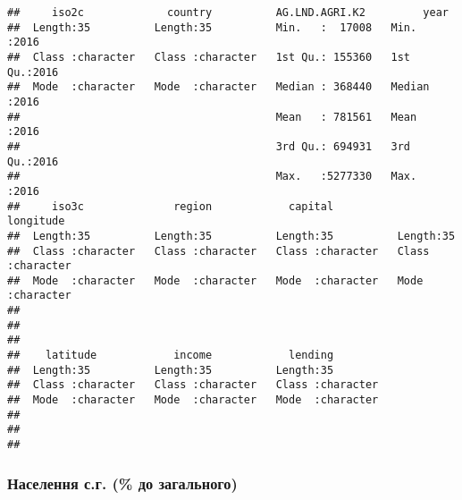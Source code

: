 \documentclass[
]{article}
\newenvironment{Shaded}{\begin{snugshade}}{\end{snugshade}}
\newcommand{\DataTypeTok}[1]{\textcolor[rgb]{0.13,0.29,0.53}{#1}}
\newcommand{\KeywordTok}[1]{\textcolor[rgb]{0.13,0.29,0.53}{\textbf{#1}}}
\newcommand{\NormalTok}[1]{#1}
\newcommand{\OperatorTok}[1]{\textcolor[rgb]{0.81,0.36,0.00}{\textbf{#1}}}
\newcommand{\OtherTok}[1]{\textcolor[rgb]{0.56,0.35,0.01}{#1}}
\newcommand{\StringTok}[1]{\textcolor[rgb]{0.31,0.60,0.02}{#1}}
\begin{document}
\begin{verbatim}
##     iso2c             country          AG.LND.AGRI.K2         year     
##  Length:35          Length:35          Min.   :  17008   Min.   :2016  
##  Class :character   Class :character   1st Qu.: 155360   1st Qu.:2016  
##  Mode  :character   Mode  :character   Median : 368440   Median :2016  
##                                        Mean   : 781561   Mean   :2016  
##                                        3rd Qu.: 694931   3rd Qu.:2016  
##                                        Max.   :5277330   Max.   :2016  
##     iso3c              region            capital           longitude        
##  Length:35          Length:35          Length:35          Length:35         
##  Class :character   Class :character   Class :character   Class :character  
##  Mode  :character   Mode  :character   Mode  :character   Mode  :character  
##                                                                             
##                                                                             
##                                                                             
##    latitude            income            lending         
##  Length:35          Length:35          Length:35         
##  Class :character   Class :character   Class :character  
##  Mode  :character   Mode  :character   Mode  :character  
##                                                          
##                                                          
## 
\end{verbatim}

\hypertarget{ux43dux430ux441ux435ux43bux435ux43dux43dux44f-ux441.ux433.-ux434ux43e-ux437ux430ux433ux430ux43bux44cux43dux43eux433ux43e}{%
\subsubsection{Населення с.г. (\% до
загального)}\label{ux43dux430ux441ux435ux43bux435ux43dux43dux44f-ux441.ux433.-ux434ux43e-ux437ux430ux433ux430ux43bux44cux43dux43eux433ux43e}}

\begin{Shaded}
\end{Shaded}
\end{document}
